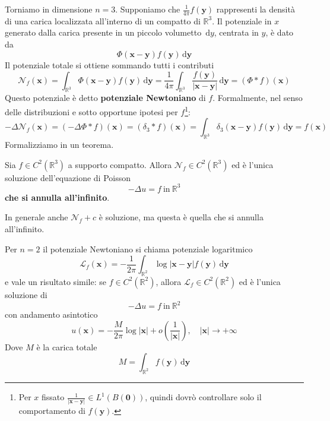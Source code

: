 \documentclass[10pt,a4paper,twoside,openright]{book}
\newcommand{\x}{\mathbf{x}}
\newcommand{\y}{\mathbf{y}}
\newcommand{\zer}{\mathbf{0}}
\newcommand{\de}{\,\mathrm d}
\newcommand{\dy}{\de y}
\newcommand{\dyy}{\de \y}
\begin{document}
Torniamo in dimensione $n=3$. Supponiamo che $\displaystyle \frac{1}{4\pi } f(\y)$ rappresenti la densità di una carica localizzata all'interno di un compatto di $\displaystyle \mathbb{R}^{3}$. Il potenziale in $x$ generato dalla carica presente in un piccolo volumetto $\dy$, centrata in $y$, è dato da
\begin{equation*}
    \Phi (\x-\y) f(\y) \dyy
\end{equation*}
Il potenziale totale si ottiene sommando tutti i contributi
\begin{equation}
    \mathcal{N}_{f}(\x) =\int _{\mathbb{R}^{3}} \Phi (\x-\y) f(\y) \dyy=\frac{1}{4\pi }\int _{\mathbb{R}^{3}}\frac{f(\y)}{|\x-\y| } \dyy=(\Phi \ast f)(\x)
\end{equation}
Questo potenziale è detto \textbf{potenziale Newtoniano} di $f$. Formalmente, nel senso delle distribuzioni e sotto opportune ipotesi per $f$\footnote{Per $x$ fissato $\frac{1}{|\x-\y| } \in L^{1}(B(\zer))$, quindi dovrò controllare solo il comportamento di $f(\y)$.}:
\begin{equation*}
    -\Delta \mathcal{N}_{f}(\x) =(-\Delta \Phi \ast f)(\x) =(\delta _{3} \ast f)(\x) =\int _{\mathbb{R}^{3}} \delta _{3}(\x-\y) f(\y) \dyy=f(\x)
\end{equation*}
Formalizziamo in un teorema.
\begin{theorem}
    Sia $\displaystyle f\in C^{2}\left(\mathbb{R}^{3}\right)$ a supporto compatto. Allora $\displaystyle \mathcal{N}_{f} \in C^{2}\left(\mathbb{R}^{3}\right)$ ed è l'unica soluzione dell'equazione di Poisson
    \begin{equation*}
        -\Delta u=f\ \text{in} \ \mathbb{R}^{3}
    \end{equation*}
    \textbf{che si annulla all'infinito}.
\end{theorem}
In generale anche $\mathcal{N}_{f}+c$ è soluzione, ma questa è quella che si annulla all'infinito.
\begin{nb}
    Per $n=2$ il potenziale Newtoniano si chiama potenziale logaritmico
    \begin{equation}
        \mathcal{L}_{f}(\x) =-\frac{1}{2\pi }\int _{\mathbb{R}^{2}}\log|\x-\y| f(\y) \dyy
    \end{equation}
    e vale un risultato simile: se $\displaystyle f\in C^{2}(\mathbb{R}^{2})$, allora $\displaystyle \mathcal{L}_{f} \in C^{2}(\mathbb{R}^{2})$ ed è l'unica soluzione di
    \begin{equation*}
        -\Delta u=f\ \text{in} \ \mathbb{R}^{2}
    \end{equation*}
    con andamento asintotico
    \begin{equation*}
        u(\x) =-\frac{M}{2\pi }\log|\x| +o\left(\frac{1}{|\x| }\right),\quad |\x| \rightarrow +\infty
    \end{equation*}
    Dove $M$ è la carica totale
    \begin{equation*}
        M=\int _{\mathbb{R}^{2}} f(\y) \dyy
    \end{equation*}
\end{nb}
\end{document}
